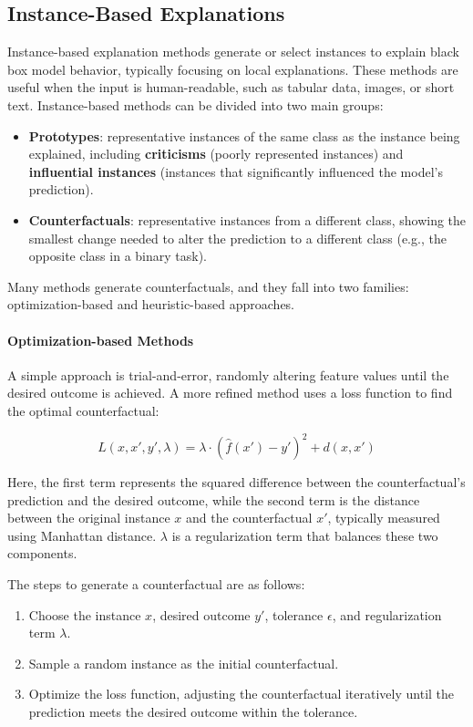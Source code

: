 \subsection{Instance-Based Explanations}
Instance-based explanation methods generate or select instances to explain black box model behavior, typically focusing on local explanations. These methods are useful when the input is human-readable, such as tabular data, images, or short text. Instance-based methods can be divided into two main groups:

\begin{itemize}
    \item \textbf{Prototypes}: representative instances of the same class as the instance being explained, including \textbf{criticisms} (poorly represented instances) and \textbf{influential instances} (instances that significantly influenced the model's prediction).
    
    \item \textbf{Counterfactuals}: representative instances from a different class, showing the smallest change needed to alter the prediction to a different class (e.g., the opposite class in a binary task).
\end{itemize}

Many methods generate counterfactuals, and they fall into two families: optimization-based and heuristic-based approaches.

\paragraph{Optimization-based Methods}

A simple approach is trial-and-error, randomly altering feature values until the desired outcome is achieved. A more refined method uses a loss function to find the optimal counterfactual:

\[
L(x, x', y', \lambda) = \lambda \cdot (\hat{f}(x') - y')^2 + d(x, x')
\]

Here, the first term represents the squared difference between the counterfactual's prediction and the desired outcome, while the second term is the distance between the original instance \( x \) and the counterfactual \( x' \), typically measured using Manhattan distance. \( \lambda \) is a regularization term that balances these two components.

The steps to generate a counterfactual are as follows:
\begin{enumerate}
    \item Choose the instance \( x \), desired outcome \( y' \), tolerance \( \epsilon \), and regularization term \( \lambda \).
    \item Sample a random instance as the initial counterfactual.
    \item Optimize the loss function, adjusting the counterfactual iteratively until the prediction meets the desired outcome within the tolerance.
\end{enumerate}

